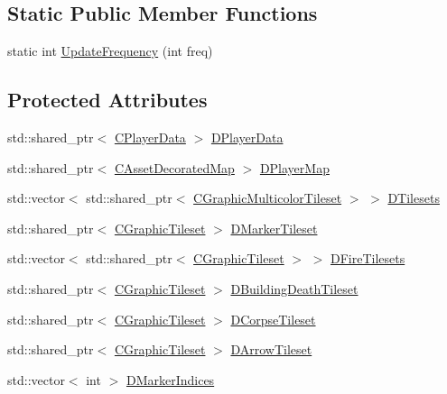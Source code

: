 \subsection*{Static Public Member Functions}
\begin{DoxyCompactItemize}
\item 
static int \hyperlink{classCAssetRenderer_a06e45891dcbc0a88570c537a4d6906c8}{Update\+Frequency} (int freq)
\end{DoxyCompactItemize}
\subsection*{Protected Attributes}
\begin{DoxyCompactItemize}
\item 
std\+::shared\+\_\+ptr$<$ \hyperlink{classCPlayerData}{C\+Player\+Data} $>$ \hyperlink{classCAssetRenderer_ae0f36013db2ef04b08b74d92249c1af5}{D\+Player\+Data}
\item 
std\+::shared\+\_\+ptr$<$ \hyperlink{classCAssetDecoratedMap}{C\+Asset\+Decorated\+Map} $>$ \hyperlink{classCAssetRenderer_a422a3f7e4202e73431fba7036e494dfe}{D\+Player\+Map}
\item 
std\+::vector$<$ std\+::shared\+\_\+ptr$<$ \hyperlink{classCGraphicMulticolorTileset}{C\+Graphic\+Multicolor\+Tileset} $>$ $>$ \hyperlink{classCAssetRenderer_ae8201de704851c1de6424a8da77b785e}{D\+Tilesets}
\item 
std\+::shared\+\_\+ptr$<$ \hyperlink{classCGraphicTileset}{C\+Graphic\+Tileset} $>$ \hyperlink{classCAssetRenderer_afc1e190959f7fd837d6aeb5858cca059}{D\+Marker\+Tileset}
\item 
std\+::vector$<$ std\+::shared\+\_\+ptr$<$ \hyperlink{classCGraphicTileset}{C\+Graphic\+Tileset} $>$ $>$ \hyperlink{classCAssetRenderer_a7598d4658acf64e85ddd6daeca88c8e6}{D\+Fire\+Tilesets}
\item 
std\+::shared\+\_\+ptr$<$ \hyperlink{classCGraphicTileset}{C\+Graphic\+Tileset} $>$ \hyperlink{classCAssetRenderer_a9eb73be9e270946c01ba769112e92d1d}{D\+Building\+Death\+Tileset}
\item 
std\+::shared\+\_\+ptr$<$ \hyperlink{classCGraphicTileset}{C\+Graphic\+Tileset} $>$ \hyperlink{classCAssetRenderer_ab7e40b5fdcb49045250e0467d6318567}{D\+Corpse\+Tileset}
\item 
std\+::shared\+\_\+ptr$<$ \hyperlink{classCGraphicTileset}{C\+Graphic\+Tileset} $>$ \hyperlink{classCAssetRenderer_a2aa6a3a0e3ae05b3165f88dcd216ffc6}{D\+Arrow\+Tileset}
\item 
std\+::vector$<$ int $>$ \hyperlink{classCAssetRenderer_a912a2f38f04bc2e5347f972f8f0caa56}{D\+Marker\+Indices}

\end{DoxyCompactItemize}
